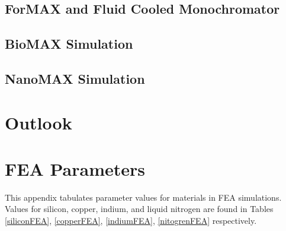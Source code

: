\documentclass[preprint]{iucr}              %
\begin{document}
\subsection{ForMAX and Fluid Cooled Monochromator}\label{formax}
\subsection{BioMAX Simulation}\label{biomax}
\subsection{NanoMAX Simulation}\label{nanomax}
\section{Outlook}


\appendix

\section{FEA Parameters}\label{feaparameters}

This appendix tabulates parameter values for materials in FEA simulations. Values for silicon, copper, indium, and liquid nitrogen are found in Tables \ref{siliconFEA}, \ref{copperFEA}, \ref{indiumFEA}, \ref{nitogrenFEA} respectively.
\vspace{1.5cm}







\cite{knuth84}
\end{document}

